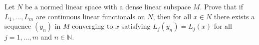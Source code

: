 Let $N$ be a normed linear space with a dense linear subspace $M$. Prove that if $L_1,\ldots,L_m$ are continuous linear functionals on $N$, then for all $x\in N$ there exists a sequence $(y_n)$ in $M$ converging to $x$ satisfying $L_j(y_n)=L_j(x)$ for all $j=1,\ldots,m$ and $n\in \mathbb{N}$.